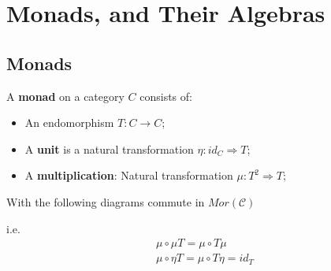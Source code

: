 \documentclass[Total.tex]{subfiles}
\begin{document}
	\chapter{Monads, and Their Algebras}
		\section{Monads}
			\begin{Def}
				A \textbf{monad} on a category $C$ consists of:
				\begin{itemize}
					\item An endomorphism $T:C\rightarrow C$;
					\item A \textbf{unit} is a natural transformation $\eta:id_C\Rightarrow T$;
					\item A \textbf{multiplication}: Natural transformation $\mu:T^2\Rightarrow T$;
				\end{itemize}
				
				With the following diagrams commute in $Mor(\mathcal{C})$
				\begin{center}
					\qquad{}
				\end{center}
				
				i.e. 
				\begin{gather*}
					\mu\circ \mu T=\mu\circ T\mu\\
					\mu\circ \eta T=\mu\circ T\eta=id_T
				\end{gather*}
			\end{Def}
			
\end{document}
